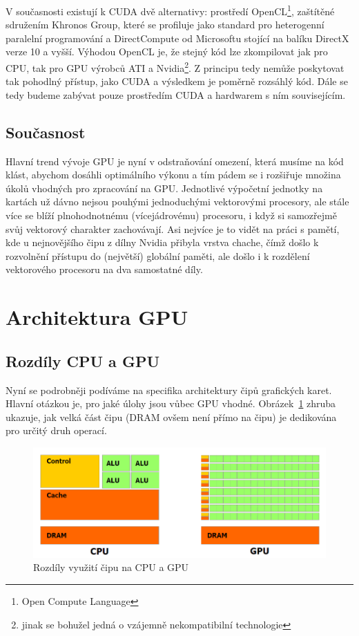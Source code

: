     V současnosti existují k CUDA dvě alternativy: prostředí OpenCL\footnote{Open Compute Language}, zaštítěné sdružením Khronos Group, které se profiluje jako standard pro heterogenní paralelní programování a DirectCompute od Microsoftu stojící na balíku DirectX verze 10 a vyšší. Výhodou OpenCL je, že stejný kód lze zkompilovat jak pro CPU, tak pro GPU výrobců ATI a Nvidia\footnote{jinak se bohužel jedná o vzájemně nekompatibilní technologie}. Z principu tedy nemůže poskytovat tak pohodlný přístup, jako CUDA a výsledkem je poměrně rozsáhlý kód. Dále se tedy budeme zabývat pouze prostředím CUDA a hardwarem s ním souvisejícím.


    \subsection{Současnost}

     Hlavní trend vývoje GPU je nyní v odstraňování omezení, která musíme na kód klást, abychom dosáhli optimálního výkonu a tím pádem se i rozšiřuje množina úkolů vhodných pro zpracování na GPU. Jednotlivé výpočetní jednotky na kartách už dávno nejsou pouhými jednoduchými vektorovými procesory, ale stále více se blíží plnohodnotnému (vícejádrovému) procesoru, i když si samozřejmě svůj vektorový charakter zachovávají. Asi nejvíce je to vidět na práci s pamětí, kde u nejnovějšího čipu \FERMI z dílny Nvidia přibyla vrstva chache, čímž došlo k rozvolnění přístupu do (největší) globální paměti, ale došlo i k rozdělení vektorového procesoru na dva samostatné díly.

\section{Architektura GPU}

    \subsection{Rozdíly CPU a GPU}

        Nyní se podrobněji podíváme na specifika architektury čipů grafických karet. Hlavní otázkou je, pro jaké úlohy jsou vůbec GPU vhodné. Obrázek~\ref{cpu vs gpu} zhruba ukazuje, jak velká část čipu (DRAM ovšem není přímo na čipu) je dedikována pro určitý druh operací.

        \begin{figure}[h]\label{cpu vs gpu}
          \includegraphics[width = \textwidth]{src/2Gpu/CPUGPU.png}
          \caption{Rozdíly využití čipu na CPU a GPU}
        \end{figure}

